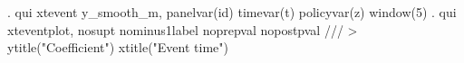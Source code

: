 . qui xtevent y_smooth_m, panelvar(id) timevar(t) policyvar(z) window(5)
{\smallskip}
. qui xteventplot, nosupt nominus1label noprepval nopostpval ///
> ytitle("Coefficient") xtitle("Event time")
{\smallskip}
